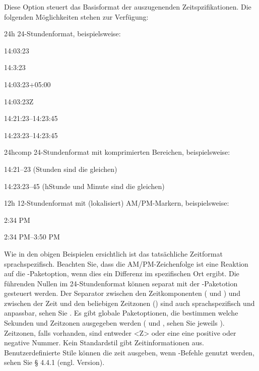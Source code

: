 \documentclass{ltxdockit}[2011/03/25]
\begin{document}
\begin{optionlist}

Diese Option steuert das Basisformat der auszugenenden Zeitspzifikationen.
Die folgenden Möglichkeiten stehen zur Verfügung:

\begin{valuelist}
\item[24h] 24-Stundenformat, beispielsweise:\par
14:03:23\par
14:3:23\par
14:03:23+05:00\par
14:03:23Z\par
14:21:23--14:23:45\par
14:23:23--14:23:45\par
\item[24hcomp] 24-Stundenformat mit komprimierten Bereichen, beispielsweise:\par
14:21--23 (Stunden sind die gleichen)\par
14:23:23--45 (hStunde und Minute sind die gleichen)\par
\item[12h] 12-Stundenformat mit (lokalisiert) AM/PM-Markern, beispielsweise:\par
2:34 PM\par
2:34 PM--3:50 PM\par
\end{valuelist}
%
Wie in den obigen Beispielen ersichtlich ist das tatsächliche Zeitformat sprachspezifisch. Beachten Sie, dass die AM/PM-Zeichenfolge ist eine Reaktion auf  die -Paketoption, wenn dies ein Differenz im spezifischen Ort ergibt. 
Die führenden Nullen im 24-Stundenformat können separat mit der 
-Paketotion gesteuert werden. Der Separator zwischen den Zeitkomponenten ( und ) und zwischen der Zeit und den beliebigen
Zeitzonen () sind auch sprachspezifisch und anpassbar, sehen Sie . Es gibt globale Paketoptionen, die bestimmen welche Sekunden
und Zeitzonen ausgegeben werden ( und , sehen Sie jeweils ). Zeitzonen, falls vorhanden, sind entweder <Z> oder
eine eine positive oder negative Nummer. Kein Standardstil gibt Zeitinformationen aus.  Benutzerdefinierte Stile können die zeit ausgeben, wenn 
-Befehle genutzt werden, sehen Sie § 4.4.1 (engl. Version).%



\end{optionlist}
\end{document}
